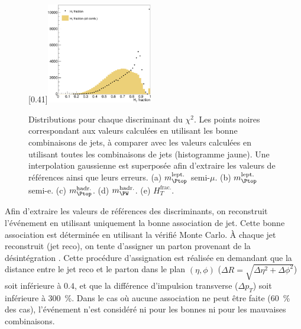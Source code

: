 \begin{figure}[p]
    \subcaptionbox{}[0.41\textwidth]{\includegraphics[width=0.41\textwidth]{chapitre6/figs/chi2/chi2_discrimant_combinations_ht_frac.pdf}}
    \caption{Distributions pour chaque discriminant du $\chi^2$. Les points noires correspondant aux valeurs calculées en utilisant les bonne combinaisons de jets, à comparer avec les valeurs calculées en utilisant toutes les combinaisons de jets (histogramme jaune). Une interpolation gaussienne est superposée afin d'extraire les valeurs de références ainsi que leurs erreurs. (a) $m_{\Ptop}^{\text{lept.}}$ semi-$\mu$. (b) $m_{\Ptop}^{\text{lept.}}$ semi-e. (c) $m_{\Ptop}^{\text{hadr.}}$. (d) $m_{\PW}^{\text{hadr.}}$. (e) $H_{T}^{\text{frac.}}$.}
    \label{fig:chi2_distributions}
\end{figure}

Afin d'extraire les valeurs de références des discriminants, on reconstruit l'événement \ttbar en utilisant uniquement la bonne association de jet. Cette bonne association est déterminée en utilisant la vérifié Monte Carlo. À chaque jet reconstruit (jet reco), on tente d'assigner un parton provenant de la désintégration \ttbar. Cette procédure d'assignation est réalisée en demandant que la distance entre le jet reco et le parton dans le plan $(\eta, \phi)$ ($\Delta R = \sqrt{\Delta \eta^2 + \Delta \phi^2}$) soit inférieure à $0.4$, et que la différence d'impulsion transverse ($\Delta p_T$) soit inférieure à \SI{300}{\%}. Dans le cas où aucune association ne peut être faite (\tilde \SI{60}{\%} des cas), l'événement n'est considéré ni pour les bonnes ni pour les mauvaises combinaisons.

